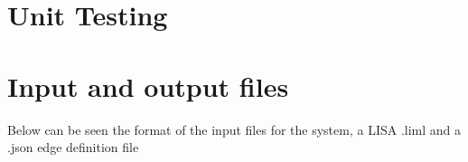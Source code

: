 





\section{Unit Testing}



\cite{Centripetal}

\section{Input and output files}
Below can be seen the format of the input files for the system, a LISA .liml and a .json edge definition file\\

